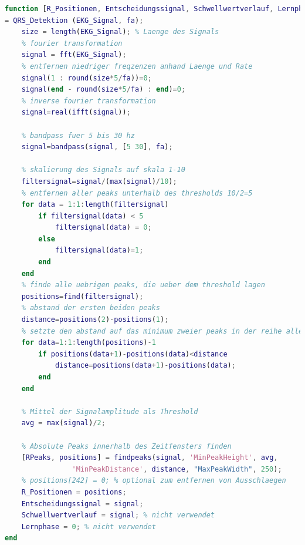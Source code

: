 \documentclass[a4paper,12pt,titlepage]{scrartcl}
\begin{document}
\begin{lstlisting}[basicstyle=\scriptsize, language=matlab]
function [R_Positionen, Entscheidungssignal, Schwellwertverlauf, Lernphase] 
= QRS_Detektion (EKG_Signal, fa);
    size = length(EKG_Signal); % Laenge des Signals
    % fourier transformation
    signal = fft(EKG_Signal);
    % entfernen niedriger freqzenzen anhand Laenge und Rate
    signal(1 : round(size*5/fa))=0;
    signal(end - round(size*5/fa) : end)=0;
    % inverse fourier transformation
    signal=real(ifft(signal));
    
    % bandpass fuer 5 bis 30 hz
    signal=bandpass(signal, [5 30], fa);
    
    % skalierung des Signals auf skala 1-10
    filtersignal=signal/(max(signal)/10);
    % entfernen aller peaks unterhalb des thresholds 10/2=5
    for data = 1:1:length(filtersignal)
        if filtersignal(data) < 5
            filtersignal(data) = 0;
        else
            filtersignal(data)=1;
        end
    end
    % finde alle uebrigen peaks, die ueber dem threshold lagen
    positions=find(filtersignal);
    % abstand der ersten beiden peaks
    distance=positions(2)-positions(1);
    % setzte den abstand auf das minimum zweier peaks in der reihe aller uebrigen peaks
    for data=1:1:length(positions)-1
        if positions(data+1)-positions(data)<distance
            distance=positions(data+1)-positions(data);
        end
    end
    
    % Mittel der Signalamplitude als Threshold
    avg = max(signal)/2; 
    
    % Absolute Peaks innerhalb des Zeitfensters finden
    [RPeaks, positions] = findpeaks(signal, 'MinPeakHeight', avg, 
                'MinPeakDistance', distance, "MaxPeakWidth", 250);
    % positions[242] = 0; % optional zum entfernen von Ausschlaegen
    R_Positionen = positions;
    Entscheidungssignal = signal;
    Schwellwertverlauf = signal; % nicht verwendet
    Lernphase = 0; % nicht verwendet
end
\end{lstlisting}
\end{document}
